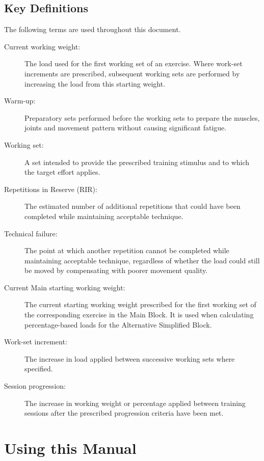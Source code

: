 \documentclass[11pt,a4paper]{article}
\begin{document}
\subsection{Key Definitions}

The following terms are used throughout this document.

\begin{description}
\item[Current working weight:] The load used for the first working set of an exercise. Where work-set increments are prescribed, subsequent working sets are performed by increasing the load from this starting weight.

\item[Warm-up:] Preparatory sets performed before the working sets to prepare the muscles, joints and movement pattern without causing significant fatigue.

\item[Working set:] A set intended to provide the prescribed training stimulus and to which the target effort applies.

\item[Repetitions in Reserve (RIR):] The estimated number of additional repetitions that could have been completed while maintaining acceptable technique. 

\item[Technical failure:] The point at which another repetition cannot be completed while maintaining acceptable technique, regardless of whether the load could still be moved by compensating with poorer movement quality.

\item[Current Main starting working weight:] The current starting working weight prescribed for the first working set of the corresponding exercise in the Main Block. It is used when calculating percentage-based loads for the Alternative Simplified Block.

\item[Work-set increment:] The increase in load applied between successive working sets where specified.

\item[Session progression:] The increase in working weight or percentage applied between training sessions after the prescribed progression criteria have been met.
\end{description}

\section{Using this Manual}
\end{document}
